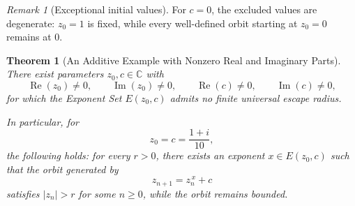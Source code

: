 \documentclass[12pt,a4paper]{amsart}
\newtheorem{theorem}{Theorem}[section]
\theoremstyle{remark}
\newtheorem{remark}{Remark}[section]
\newcommand{\C}{\mathbb{C}}
\begin{document}
\begin{remark}[Exceptional initial values]
For $c=0$, the excluded values are degenerate: $z_0=1$ is fixed, while every
well-defined orbit starting at $z_0=0$ remains at $0$.
\end{remark}

\smallskip

\begin{theorem}[An Additive Example with Nonzero Real and Imaginary Parts]
\label{thm:no-universal-radius-nonzero-components}
There exist parameters $z_0,c\in\C$ with
\[
\operatorname{Re}(z_0)\ne 0,
\qquad
\operatorname{Im}(z_0)\ne 0,
\qquad
\operatorname{Re}(c)\ne 0,
\qquad
\operatorname{Im}(c)\ne 0,
\]
for which the Exponent Set $E(z_0,c)$ admits no finite universal escape
radius.

In particular, for
\[
z_0=c=\frac{1+i}{10},
\]
the following holds: for every $r>0$, there exists an exponent
$x\in E(z_0,c)$ such that the orbit generated by
\[
z_{n+1}=z_n^{\,x}+c
\]
satisfies $|z_n|>r$ for some $n\ge 0$, while the orbit remains bounded.
\end{theorem}
\end{document}
